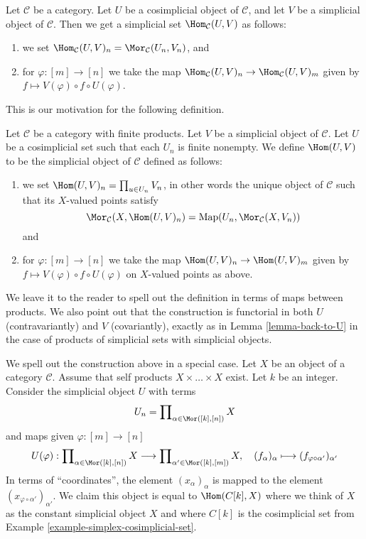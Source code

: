 \noindent
Let $\mathcal{C}$ be a category. Let $U$ be a cosimplicial object of
$\mathcal{C}$, and let $V$ be a simplicial object of $\mathcal{C}$.
Then we get a simplicial set $\Hom_\mathcal{C}(U, V)$ as follows:
\begin{enumerate}
\item we set
$\Hom_\mathcal{C}(U, V)_n = \Mor_\mathcal{C}(U_n, V_n)$, and
\item for $\varphi : [m] \to [n]$ we take the map
$\Hom_\mathcal{C}(U, V)_n \to \Hom_\mathcal{C}(U, V)_m$
given by $f \mapsto V(\varphi) \circ f \circ U(\varphi)$.
\end{enumerate}
This is our motivation for the following definition.

\begin{definition}
\label{definition-hom-deltak-simplicial}
Let $\mathcal{C}$ be a category with finite products.
Let $V$ be a simplicial object of $\mathcal{C}$.
Let $U$ be a cosimplicial set such that each $U_n$ is finite nonempty.
We define {\it $\Hom(U, V)$} to be
the simplicial object of $\mathcal{C}$ defined
as follows:
\begin{enumerate}
\item we set $\Hom(U, V)_n = \prod_{u \in U_n} V_n$,
in other words the unique object of $\mathcal{C}$ such
that its $X$-valued points satisfy
$$
\Mor_\mathcal{C}(X, \Hom(U, V)_n)
=
\text{Map}(U_n, \Mor_\mathcal{C}(X, V_n))
$$
and
\item for $\varphi : [m] \to [n]$ we take the map
$\Hom(U, V)_n \to \Hom(U, V)_m$
given by $f \mapsto V(\varphi) \circ f \circ U(\varphi)$
on $X$-valued points as above.
\end{enumerate}
\end{definition}

\noindent
We leave it to the reader to spell out the
definition in terms of maps between products.
We also point out that the construction is functorial
in both $U$ (contravariantly) and $V$ (covariantly), exactly as in
Lemma \ref{lemma-back-to-U} in the case of
products of simplicial sets with simplicial objects.

\medskip\noindent
We spell out the construction above in a special case.
Let $X$ be an object of a category $\mathcal{C}$.
Assume that self products $X \times \ldots \times X$ exist.
Let $k$ be an integer.
Consider the simplicial object $U$ with terms
$$
U_n = \prod\nolimits_{\alpha \in \Mor([k], [n])} X
$$
and maps given $\varphi : [m] \to [n]$
$$
U(\varphi) :
\prod\nolimits_{\alpha \in \Mor([k], [n])} X
\longrightarrow
\prod\nolimits_{\alpha' \in \Mor([k], [m])} X, \quad
(f_{\alpha})_{\alpha} \longmapsto
(f_{\varphi \circ \alpha'})_{\alpha'}
$$
In terms of ``coordinates'', the element $(x_\alpha)_\alpha$
is mapped to the element $(x_{\varphi \circ \alpha'})_{\alpha'}$.
We claim this object is equal to $\Hom(C[k], X)$
where we think of $X$ as the constant simplicial object $X$
and where $C[k]$ is the cosimplicial set from
Example \ref{example-simplex-cosimplicial-set}.

